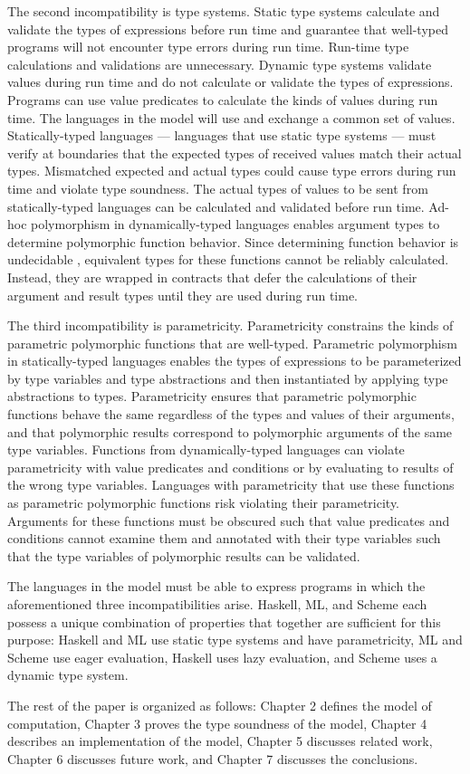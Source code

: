 The second incompatibility is type systems.  Static type systems calculate and validate the types of expressions before run time and guarantee that well-typed programs will not encounter type errors during run time.  Run-time type calculations and validations are unnecessary.  Dynamic type systems validate values during run time and do not calculate or validate the types of expressions.  Programs can use value predicates to calculate the kinds of values during run time.  The languages in the model will use and exchange a common set of values.  Statically-typed languages --- languages that use static type systems --- must verify at boundaries that the expected types of received values match their actual types.  Mismatched expected and actual types could cause type errors during run time and violate type soundness.  The actual types of values to be sent from statically-typed languages can be calculated and validated before run time.  Ad-hoc polymorphism in dynamically-typed languages enables argument types to determine polymorphic function behavior.  Since determining function behavior is undecidable \cite{blume04}, equivalent types for these functions cannot be reliably calculated.  Instead, they are wrapped in contracts \cite{findler02} that defer the calculations of their argument and result types until they are used during run time.

The third incompatibility is parametricity.  Parametricity constrains the kinds of parametric polymorphic functions that are well-typed.  Parametric polymorphism in statically-typed languages enables the types of expressions to be parameterized by type variables and type abstractions and then instantiated by applying type abstractions to types.  Parametricity ensures that parametric polymorphic functions behave the same regardless of the types and values of their arguments, and that polymorphic results correspond to polymorphic arguments of the same type variables.  Functions from dynamically-typed languages can violate parametricity with value predicates and conditions or by evaluating to results of the wrong type variables.  Languages with parametricity that use these functions as parametric polymorphic functions risk violating their parametricity.  Arguments for these functions must be obscured such that value predicates and conditions cannot examine them and annotated with their type variables such that the type variables of polymorphic results can be validated.

The languages in the model must be able to express programs in which the aforementioned three incompatibilities arise.  Haskell, ML, and Scheme each possess a unique combination of properties that together are sufficient for this purpose: Haskell and ML use static type systems and have parametricity, ML and Scheme use eager evaluation, Haskell uses lazy evaluation, and Scheme uses a dynamic type system.

The rest of the paper is organized as follows: Chapter 2 defines the model of computation, Chapter 3 proves the type soundness of the model, Chapter 4 describes an implementation of the model, Chapter 5 discusses related work, Chapter 6 discusses future work, and Chapter 7 discusses the conclusions.